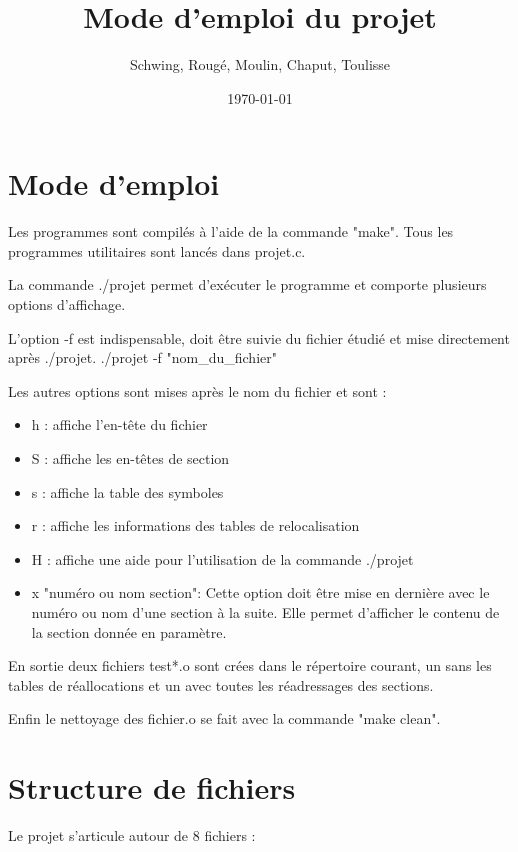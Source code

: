 \documentclass[12pt, a4paper]{article}
\title{Mode d'emploi du projet}
\author{Schwing, Roug\'e, Moulin, Chaput, Toulisse}
\date{\today}
\begin{document}
\maketitle

\section{Mode d'emploi}

Les programmes sont compilés à l'aide de la commande "make".
Tous les programmes utilitaires sont lancés dans projet.c.


La commande ./projet permet d'exécuter le programme et comporte plusieurs options d'affichage.


L'option -f est indispensable, doit être suivie du fichier étudié et mise directement après ./projet.	
./projet -f "nom\_du\_fichier"


Les autres options sont mises après le nom du fichier et sont :
\begin{itemize}


		 \item h : affiche l'en-tête du fichier
		 \item S : affiche les en-têtes de section
		 \item s : affiche la table des symboles
		 \item r : affiche les informations des tables de relocalisation
		 \item H : affiche une aide pour l'utilisation de la commande ./projet
		 \item x "numéro ou nom section": Cette option doit être mise en dernière avec le numéro ou nom d'une section à la suite.
					Elle permet d'afficher le contenu de la section donnée en paramètre.

\end{itemize}

En sortie deux fichiers test*.o sont crées dans le répertoire courant, un sans les tables de réallocations et un avec toutes les réadressages des sections.

Enfin le nettoyage des fichier.o se fait avec la commande "make clean".

\section{Structure de fichiers}


Le projet s'articule autour de 8 fichiers : 
\end{document}
